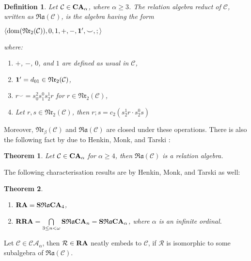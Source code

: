 \documentclass[a4paper]{article}
\theoremstyle{defin}
\newtheorem{defin}{Definition}
\theoremstyle{theorem}
\newtheorem{theorem}{Theorem}
\theoremstyle{prop}
\theoremstyle{lemma}
\theoremstyle{fact}
\theoremstyle{ex}
\theoremstyle{col}
\begin{document}
\begin{defin}
  Let $\mathcal{C} \in {\bf CA}_{\alpha}$, where $\alpha \geq 3$. The relation algebra reduct of $\mathcal{C}$, written as $\mathfrak{Ra}(\mathcal{C})$, is the algebra having the form

  \begin{center}
    $\langle \operatorname{dom}(\mathfrak{Nr}_2(\mathcal{C})), 0, 1, +, -, {\bf 1}', \smile, ; \rangle$
  \end{center}
  where:

  \begin{enumerate}
    \item $+$, $-$, $0$, and $1$ are defined as usual in $\mathcal{C}$,
    \item ${\bf 1}' = d_{01} \in \mathfrak{Nr}_2(\mathcal{C})$,
    \item $r^{\smile} = s^{2}_{0} s^{0}_{1} s^{1}_{2} r$ for $r \in \mathfrak{Nr}_2(\mathcal{C})$,
    \item Let $r, s \in \mathfrak{Nr}_2(\mathcal{C})$, then $r ; s = c_2 (s^{1}_{2}r \cdot s^{0}_{2}s)$
  \end{enumerate}
\end{defin}

Moreover, $\mathfrak{Nr}_{\beta}(\mathcal{C})$ and $\mathfrak{Ra}(\mathcal{C})$ are closed under these operations.
There is also the following fact by due to Henkin, Monk, and Tarski \cite{Henkin1988-HENCAP-4}:
\begin{theorem}
  Let $\mathcal{C} \in {\bf CA}_{\alpha}$ for $\alpha \geq 4$, then $\mathfrak{Ra}(\mathcal{C})$ is a relation algebra.
\end{theorem}

The following characterisation results are by Henkin, Monk, and Tarski \cite{Henkin1988-HENCAP-4} as well:
\begin{theorem} \label{char}
  $ $

  \begin{enumerate}
    \item ${\bf RA} = {\bf S} \mathfrak{Ra} {\bf CA}_4$,
    \item ${\bf RRA} = \bigcap \limits_{3 \leq n < \omega} {\bf S} \mathfrak{Ra} {\bf CA}_n =  {\bf S} \mathfrak{Ra} {\bf CA}_{\alpha}$, where $\alpha$ is an infinite ordinal.
  \end{enumerate}
\end{theorem}

Let $\mathcal{C} \in \mathcal{CA}_{\alpha}$, then $\mathcal{R} \in {\bf RA}$ neatly embeds to $\mathcal{C}$, if $\mathcal{R}$ is isomorphic to some subalgebra of $\mathfrak{Ra}(\mathcal{C})$.
\end{document}
